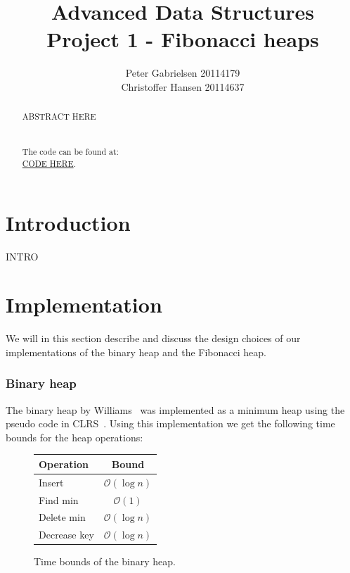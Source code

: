 \documentclass[a4paper,oneside,article,11pt]{memoir}
\title{Advanced Data Structures \\ Project 1 - Fibonacci heaps}
\author{Peter Gabrielsen 20114179 \\
Christoffer Hansen 20114637}
\begin{document}
\begin{titlingpage}
\clearpage

\maketitle
\thispagestyle{empty}

\begin{abstract}
ABSTRACT HERE
\\
\\
\\
The code can be found at: \\\url{CODE HERE}.
\end{abstract}
\end{titlingpage}

\pagebreak

\tableofcontents

\pagebreak

\chapter{Introduction}
INTRO

\chapter{Implementation}
We will in this section describe and discuss the design choices of our implementations of the binary heap and the Fibonacci heap.
\subsection{Binary heap}
The binary heap by Williams~\cite{williams} was implemented as a minimum heap using the pseudo code in CLRS~\cite[p.~151-170]{clrs}. Using this implementation we get the following time bounds for the heap operations:

\begin{figure}[H]
\centering
\begin{tabular}{l|c}
Operation & Bound \\\hline
Insert & $\mathcal{O}(\log n)$ \\\hline
Find min & $\mathcal{O}(1)$ \\\hline
Delete min & $\mathcal{O}(\log n)$ \\\hline
Decrease key & $\mathcal{O}(\log n)$
\end{tabular}
\caption{Time bounds of the binary heap.}
\end{figure}
\end{document}
